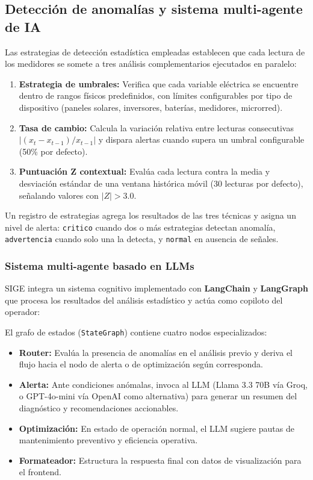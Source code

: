 \documentclass[journal,article,submit,pdftex,moreauthors]{Definitions/mdpi}
\begin{document}
\subsection{Detecci\'on de anomal\'ias y sistema multi-agente de IA}
Las estrategias de detección estadística empleadas establecen que cada lectura de los medidores se somete a tres análisis complementarios ejecutados en paralelo:
\begin{enumerate}
    \item \textbf{Estrategia de umbrales:} Verifica que cada variable el\'ectrica se encuentre dentro de rangos f\'isicos predefinidos, con l\'imites configurables por tipo de dispositivo (paneles solares, inversores, bater\'ias, medidores, microrred).
    \item \textbf{Tasa de cambio:} Calcula la variaci\'on relativa entre lecturas consecutivas $|(x_t - x_{t-1}) / x_{t-1}|$ y dispara alertas cuando supera un umbral configurable (50\% por defecto).
    \item \textbf{Puntuaci\'on Z contextual:} Eval\'ua cada lectura contra la media y desviaci\'on est\'andar de una ventana hist\'orica m\'ovil (30 lecturas por defecto), se\~nalando valores con $|Z| > 3.0$.
\end{enumerate}

Un registro de estrategias agrega los resultados de las tres t\'ecnicas y asigna un nivel de alerta: \texttt{critico} cuando dos o m\'as estrategias detectan anomal\'ia, \texttt{advertencia} cuando solo una la detecta, y \texttt{normal} en ausencia de se\~nales.

\subsubsection{Sistema multi-agente basado en LLMs}
SIGE integra un sistema cognitivo implementado con \textbf{LangChain} y \textbf{LangGraph} que procesa los resultados del an\'alisis estad\'istico y act\'ua como copiloto del operador:

El grafo de estados (\texttt{StateGraph}) contiene cuatro nodos especializados:
\begin{itemize}
    \item \textbf{Router:} Eval\'ua la presencia de anomal\'ias en el an\'alisis previo y deriva el flujo hacia el nodo de alerta o de optimizaci\'on seg\'un corresponda.
    \item \textbf{Alerta:} Ante condiciones an\'omalas, invoca al LLM (Llama 3.3 70B v\'ia Groq, o GPT-4o-mini v\'ia OpenAI como alternativa) para generar un resumen del diagn\'ostico y recomendaciones accionables.
    \item \textbf{Optimizaci\'on:} En estado de operaci\'on normal, el LLM sugiere pautas de mantenimiento preventivo y eficiencia operativa.
    \item \textbf{Formateador:} Estructura la respuesta final con datos de visualizaci\'on para el frontend.
\end{itemize}
\end{document}
